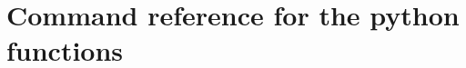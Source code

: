 \documentclass[a4paper]{article}
\begin{document}
\newpage

\appendix

\def\tableofcontents{}
\section{Command reference for the python functions}
\label{reference_facade}



\end{document}
